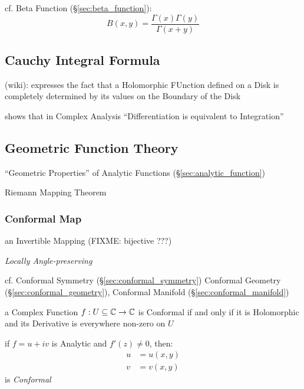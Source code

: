 cf. Beta Function (\S\ref{sec:beta_function}):
\[
  B(x, y) = \frac{\Gamma(x)\Gamma(y)}{\Gamma(x + y)}
\]



\subsection{Cauchy Integral Formula}\label{sec:cauchy_integral}

(wiki): expresses the fact that a Holomorphic FUnction defined on a Disk is
completely determined by its values on the Boundary of the Disk

shows that in Complex Analysis ``Differentiation is equivalent to
Integration''



\subsection{Geometric Function Theory}\label{sec:geometric_function_theory}

``Geometric Properties'' of Analytic Functions (\S\ref{sec:analytic_function})

Riemann Mapping Theorem



\subsubsection{Conformal Map}\label{sec:conformal_map}

an Invertible Mapping (FIXME: bijective ???)

\emph{Locally Angle-preserving}

cf. Conformal Symmetry (\S\ref{sec:conformal_symmetry}) Conformal Geometry
(\S\ref{sec:conformal_geometry}), Conformal Manifold
(\S\ref{sec:conformal_manifold})

a Complex Function $f : U \subseteq \mathbb{C} \to \mathbb{C}$ is Conformal if and only
if it is Holomorphic and its Derivative is everywhere non-zero on $U$

if $f = u + iv$ is Analytic and $f'(z) \neq 0$, then:
\begin{align*}
  u & = u(x,y) \\
  v & = v(x,y)
\end{align*}
is \emph{Conformal}

